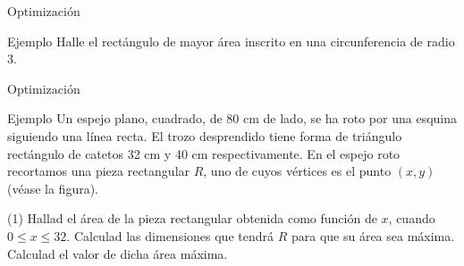 \documentclass[8pt]{beamer}
\begin{document}
\begin{frame}[t]{Optimización}
\begin{exampleblock}{Ejemplo}
Halle el rectángulo de mayor área inscrito en una circunferencia de radio 3.
\end{exampleblock}
\end{frame}

\begin{frame}[t]{Optimización}
\begin{exampleblock}{Ejemplo}
Un espejo plano, cuadrado, de 80 cm de lado, se ha roto por una esquina siguiendo una línea recta. El trozo desprendido tiene forma de triángulo rectángulo de catetos 32 cm y 40 cm respectivamente. En el espejo roto recortamos una pieza rectangular $R$, uno de cuyos vértices es el punto $(x,y)$ (véase la figura).
\begin{tasks}[label=\alph*)](1)
\task Hallad el área de la pieza rectangular obtenida como función de $x$, cuando \\ $0 \leq x \leq 32$.
\task Calculad las dimensiones que tendrá $R$ para que su área sea máxima. 
\task Calculad el valor de dicha área máxima.
\end{tasks}
\end{exampleblock}
\begin{center}
\end{center}
\end{frame}
\end{document}
